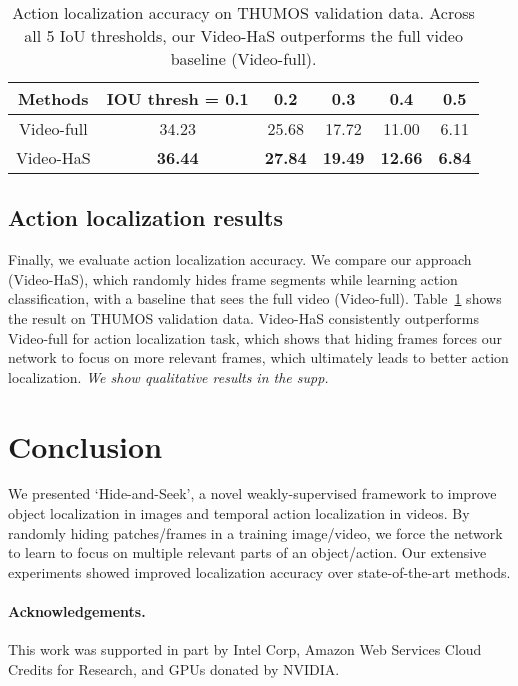 \documentclass[10pt,twocolumn,letterpaper]{article}
\begin{document}
\begin{table}[t!]
              \begin{center}
                  \footnotesize
                  \begin{tabular}{| c | c | c| c| c| c|}
                  \hline    	
	                Methods     & IOU thresh = 0.1 & 0.2 & 0.3 & 0.4 & 0.5 \\
	                \hline
					Video-full & 34.23 &   25.68 &   17.72   & 11.00 &   6.11\\
					Video-HaS & \textbf{36.44}   & \textbf{27.84} &   \textbf{19.49} &   \textbf{12.66}  &  \textbf{6.84}\\
					 \hline
					                   \end{tabular}

      \caption{Action localization accuracy on THUMOS validation data.   Across all 5 IoU thresholds, our Video-HaS outperforms the full video baseline (Video-full).}
                          \label{table:frame_hide}
                          \end{center}
                          \vspace*{-0.2in}
                          \end{table}\subsection{Action localization results}

Finally, we evaluate action localization accuracy.  We compare our approach (Video-HaS), which randomly hides frame segments while learning action classification, with a baseline that sees the full video (Video-full).  Table~\ref{table:frame_hide} shows the result on THUMOS validation data.  Video-HaS consistently outperforms Video-full for action localization task, which shows that hiding frames forces our network to focus on more relevant frames, which ultimately leads to better action localization.  \emph{We show qualitative results in the supp.}


\section{Conclusion}
\vspace*{-0.05in}

We presented `Hide-and-Seek', a novel weakly-supervised framework to improve object localization in images and temporal action localization in videos.  By randomly hiding patches/frames in a training image/video, we force the network to learn to focus on multiple relevant parts of an object/action.  Our extensive experiments showed improved localization accuracy over state-of-the-art methods.

\vspace{-10pt}
\paragraph{Acknowledgements.}
 This work was supported in part by Intel Corp, Amazon Web Services Cloud Credits for Research, and GPUs donated by NVIDIA.

{\small


}
\end{document}
